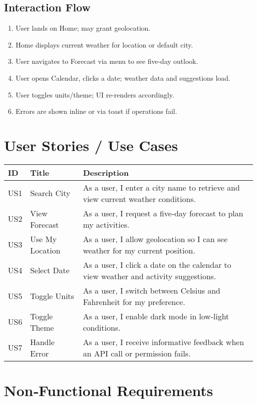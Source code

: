 \documentclass[12pt,a4paper]{article}
\begin{document}
\subsection*{Interaction Flow}
\begin{enumerate}[nosep]
  \item User lands on Home; may grant geolocation.
  \item Home displays current weather for location or default city.
  \item User navigates to Forecast via menu to see five‐day outlook.
  \item User opens Calendar, clicks a date; weather data and suggestions load.
  \item User toggles units/theme; UI re-renders accordingly.
  \item Errors are shown inline or via toast if operations fail.
\end{enumerate}




\section{User Stories / Use Cases}
\begin{longtable}{|p{1cm}|p{3cm}|p{10cm}|}
\hline
\textbf{ID} & \textbf{Title} & \textbf{Description} \\
\hline
US1 & Search City & As a user, I enter a city name to retrieve and view current weather conditions. \\
\hline
US2 & View Forecast & As a user, I request a five‐day forecast to plan my activities. \\
\hline
US3 & Use My Location & As a user, I allow geolocation so I can see weather for my current position. \\
\hline
US4 & Select Date & As a user, I click a date on the calendar to view weather and activity suggestions. \\
\hline
US5 & Toggle Units & As a user, I switch between Celsius and Fahrenheit for my preference. \\
\hline
US6 & Toggle Theme & As a user, I enable dark mode in low‐light conditions. \\
\hline
US7 & Handle Error & As a user, I receive informative feedback when an API call or permission fails. \\
\hline
\end{longtable}



\section{Non‐Functional Requirements}
\end{document}
